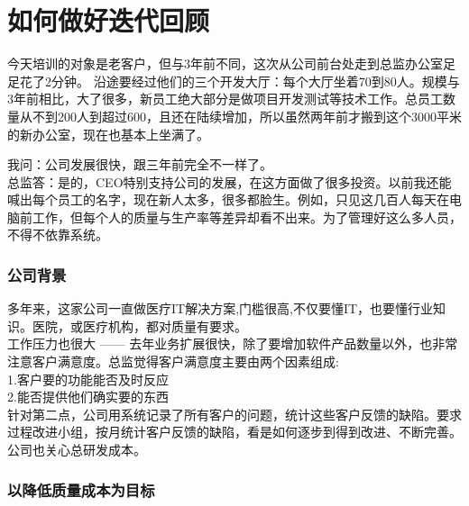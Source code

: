 \chapter{如何做好迭代回顾} %


今天培训的对象是老客户，但与3年前不同，这次从公司前台处走到总监办公室足足花了2分钟。 沿途要经过他们的三个开发大厅：每个大厅坐着70到80人。规模与3年前相比，大了很多，新员工绝大部分是做项目开发测试等技术工作。总员工数量从不到200人到超过600，且还在陆续增加，所以虽然两年前才搬到这个3000平米的新办公室，现在也基本上坐满了。

我问：公司发展很快，跟三年前完全不一样了。\\
总监答：是的，CEO特别支持公司的发展，在这方面做了很多投资。以前我还能喊出每个员工的名字，现在新人太多，很多都脸生。例如，只见这几百人每天在电脑前工作，但每个人的质量与生产率等差异却看不出来。为了管理好这么多人员，不得不依靠系统。 \\

\hypertarget{ux4eceux9879ux76eeux51b2ux523aux7684ux56deux987eux590dux76d8ux5f00ux59cb}{%
\subsection{公司背景}\label{ux4eceux9879ux76eeux51b2ux523aux7684ux56deux987eux590dux76d8ux5f00ux59cb}}

多年来，这家公司一直做医疗IT解决方案,门槛很高,不仅要懂IT，也要懂行业知识。医院，或医疗机构，都对质量有要求。\\
工作压力也很大 —— 去年业务扩展很快，除了要增加软件产品数量以外，也非常注意客户满意度。总监觉得客户满意度主要由两个因素组成:\\

1.客户要的功能能否及时反应\\
2.能否提供他们确实要的东西\\

针对第二点，公司用系统记录了所有客户的问题，统计这些客户反馈的缺陷。要求过程改进小组，按月统计客户反馈的缺陷，看是如何逐步到得到改进、不断完善。公司也关心总研发成本。 \\

\hypertarget{ux4eceux9879ux76eeux51b2ux523aux7684ux56deux987eux590dux76d8ux5f00ux59cb}{%
\subsection{以降低质量成本为目标}\label{ux4eceux9879ux76eeux51b2ux523aux7684ux56deux987eux590dux76d8ux5f00ux59cb}}


